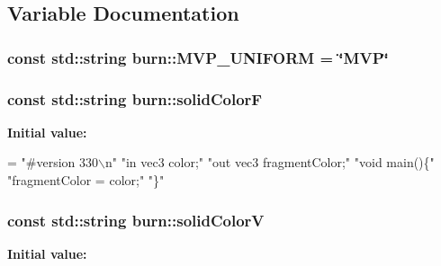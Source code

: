 \subsection{Variable Documentation}
\hypertarget{namespaceburn_a6e76b4eddd0b0e54b5969cde910d0bc0}{
\subsubsection[{M\-V\-P\-\_\-\-U\-N\-I\-F\-O\-R\-M}]{\setlength{\rightskip}{0pt plus 5cm}const std\-::string burn\-::\-M\-V\-P\-\_\-\-U\-N\-I\-F\-O\-R\-M = \char`\"{}M\-V\-P\char`\"{}}}\label{namespaceburn_a6e76b4eddd0b0e54b5969cde910d0bc0}
\hypertarget{namespaceburn_ab930855fc914e51fe8d7f734a5534c6d}{
\subsubsection[{solid\-Color\-F}]{\setlength{\rightskip}{0pt plus 5cm}const std\-::string burn\-::solid\-Color\-F}}\label{namespaceburn_ab930855fc914e51fe8d7f734a5534c6d}
{\bfseries Initial value\-:}
\begin{DoxyCode}
= \textcolor{stringliteral}{"#version 330\(\backslash\)n"}
        \textcolor{stringliteral}{"in vec3 color;"}
        \textcolor{stringliteral}{"out vec3 fragmentColor;"}
        \textcolor{stringliteral}{"void main()\{"}
        \textcolor{stringliteral}{"fragmentColor = color;"}
        \textcolor{stringliteral}{"\}"}
\end{DoxyCode}
\hypertarget{namespaceburn_a6eafdfe4d85acab9368409999e505dd3}{
\subsubsection[{solid\-Color\-V}]{\setlength{\rightskip}{0pt plus 5cm}const std\-::string burn\-::solid\-Color\-V}}\label{namespaceburn_a6eafdfe4d85acab9368409999e505dd3}
{\bfseries Initial value\-:}
